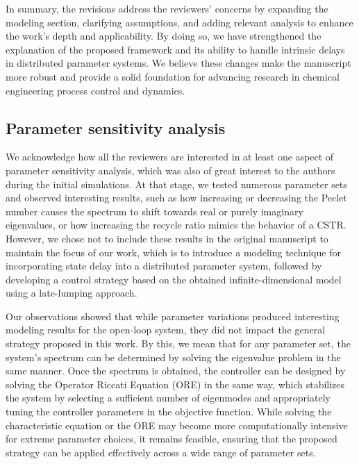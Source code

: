 \documentclass[12pt,answers]{exam}
\begin{document}
In summary, the revisions address the reviewers’ concerns by expanding the modeling section, clarifying assumptions, and adding relevant analysis to enhance the work’s depth and applicability. By doing so, we have strengthened the explanation of the proposed framework and its ability to handle intrinsic delays in distributed parameter systems. We believe these changes make the manuscript more robust and provide a solid foundation for advancing research in chemical engineering process control and dynamics.

\subsection{Parameter sensitivity analysis}

We acknowledge how all the reviewers are interested in at least one aspect of parameter sensitivity analysis, which was also of great interest to the authors during the initial simulations. At that stage, we tested numerous parameter sets and observed interesting results, such as how increasing or decreasing the Peclet number causes the spectrum to shift towards real or purely imaginary eigenvalues, or how increasing the recycle ratio mimics the behavior of a CSTR. However, we chose not to include these results in the original manuscript to maintain the focus of our work, which is to introduce a modeling technique for incorporating state delay into a distributed parameter system, followed by developing a control strategy based on the obtained infinite-dimensional model using a late-lumping approach.

Our observations showed that while parameter variations produced interesting modeling results for the open-loop system, they did not impact the general strategy proposed in this work. By this, we mean that for any parameter set, the system’s spectrum can be determined by solving the eigenvalue problem in the same manner. Once the spectrum is obtained, the controller can be designed by solving the Operator Riccati Equation (ORE) in the same way, which stabilizes the system by selecting a sufficient number of eigenmodes and appropriately tuning the controller parameters in the objective function. While solving the characteristic equation or the ORE may become more computationally intensive for extreme parameter choices, it remains feasible, ensuring that the proposed strategy can be applied effectively across a wide range of parameter sets.
\end{document}
